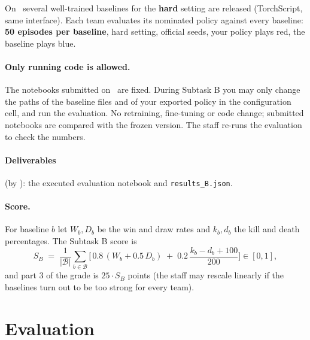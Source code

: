 \documentclass[11pt,a4paper]{article}
\newcommand{\code}[1]{\texttt{#1}}
\begin{document}
On \DateBStart\ several well-trained baselines for the \textbf{hard} setting are released
(TorchScript, same interface).  Each team evaluates its nominated policy against every
baseline: \textbf{50 episodes per baseline}, hard setting, official seeds, your policy
plays red, the baseline plays blue.

\paragraph{Only running code is allowed.}
The notebooks submitted on \DateAEnd\ are fixed.  During Subtask B you may only change the
paths of the baseline files and of your exported policy in the configuration cell, and run
the evaluation.  No retraining, fine-tuning or code change; submitted notebooks are
compared with the frozen version.  The staff re-runs the evaluation to check the numbers.

\paragraph{Deliverables} (by \DateBEnd): the executed evaluation notebook and
\code{results\_B.json}.

\paragraph{Score.}
For baseline $b$ let $W_b, D_b$ be the win and draw rates and $k_b, d_b$ the kill and
death percentages.  The Subtask B score is
\[
  S_B \;=\; \frac{1}{|\mathcal{B}|}\sum_{b\in\mathcal{B}}
  \Big[\,0.8\,(W_b + 0.5\,D_b) \;+\; 0.2\,\frac{k_b - d_b + 100}{200}\Big] \in [0,1],
\]
and part 3 of the grade is $25 \cdot S_B$ points (the staff may rescale linearly if the
baselines turn out to be too strong for every team).

\section{Evaluation}
\end{document}
